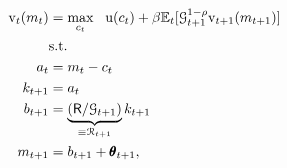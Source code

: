   \begin{equation}\begin{gathered}\begin{aligned}
        {\mathrm{v}}_{t}({m}_{t}) & = \max_{{c}_{t}} ~~ \mathrm{u}({c}_{t})+
        {\beta}{\mathbb{E}}_{t}[ \mathcal{G}_{t+1}^{1-{\rho}}{\mathrm{v}}_{t+1}({m}_{t+1})] \label{eq:vNormed}                   \\
                                         & \text{s.t.}                                                                                 \\
        {a}_{t}                       & = {m}_{t}-{c}_{t}                                                                     \\
        {k}_{t+1}                     & = {a}_{t}                                                                                \\
        {b}_{t+1}                     & = \underbrace{\left({\mathsf{R}}/\mathcal{G}_{t+1}\right)}_{\equiv \mathcal{R}_{t+1}}{k}_{t+1} \\
        {m}_{t+1}                        & = {b}_{t+1}+\pmb{\theta}_{t+1},
      \end{aligned}\end{gathered}\end{equation}
